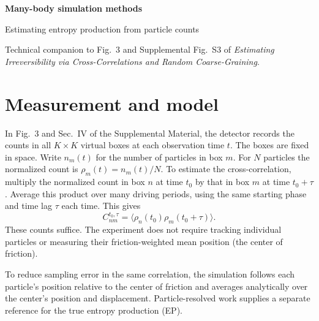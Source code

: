 \documentclass[11pt,letterpaper]{article}
\begin{document}
\thispagestyle{plain}
{\LARGE\bfseries Many-body simulation methods\par}
{\large Estimating entropy production from particle counts\par}
\vspace{3pt}
Technical companion to Fig.~3 and Supplemental Fig.~S3 of
\emph{Estimating Irreversibility via Cross-Correlations and Random Coarse-Graining}.

\section{Measurement and model}
In Fig.~3 and Sec.~IV of the Supplemental Material, the detector records the counts in all
$K\times K$ virtual boxes at each observation time $t$. The boxes are fixed in space.
Write $n_m(t)$ for the number of particles in box $m$.
For $N$ particles the normalized count is $\rho_m(t)=n_m(t)/N$.
To estimate the cross-correlation, multiply the normalized count in box $n$ at time $t_0$
by that in box $m$ at time $t_0+\tau$. Average this product over many driving periods,
using the same starting phase and time lag $\tau$ each time. This gives
\begin{equation}
 C^{t_0,\tau}_{nm}=\big\langle\rho_n(t_0)\rho_m(t_0+\tau)\big\rangle .
 \label{eq:C}
\end{equation}
These counts suffice. The experiment does not require tracking individual particles or
measuring their friction-weighted mean position (the center of friction).

To reduce sampling error in the same correlation, the simulation follows each particle's
position relative to the center of friction and averages analytically over the center's
position and displacement. Particle-resolved work supplies a separate reference for the
true entropy production (EP).
\end{document}
